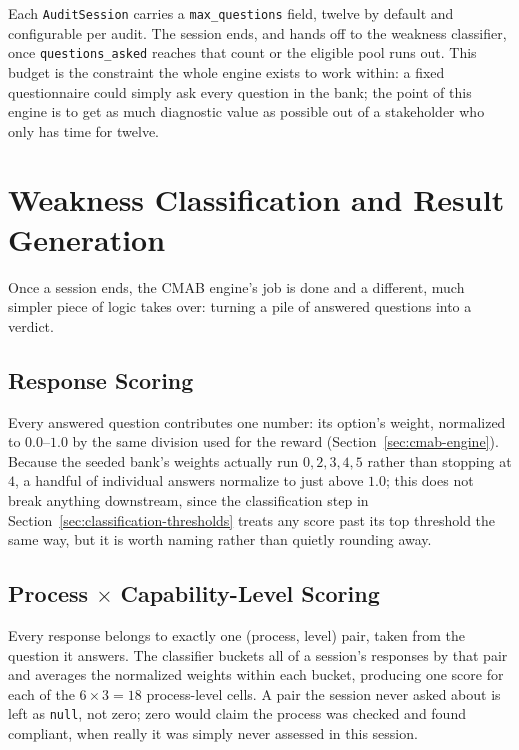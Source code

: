\documentclass[a4paper, 12pt, oneside, openany, BCOR1cm,toc=chapterentrywithdots]{scrbook}
\begin{document}
Each \texttt{AuditSession} carries a \texttt{max\_questions} field, twelve by default and
configurable per audit. The session ends, and hands off to the weakness classifier, once
\texttt{questions\_asked} reaches that count or the eligible pool runs out. This budget is the
constraint the whole engine exists to work within: a fixed questionnaire could simply ask every
question in the bank; the point of this engine is to get as much diagnostic value as possible out
of a stakeholder who only has time for twelve.
\section{Weakness Classification and Result Generation}
\label{sec:weakness-classification}

Once a session ends, the CMAB engine's job is done and a different, much simpler piece of logic
takes over: turning a pile of answered questions into a verdict.

\subsection{Response Scoring}

Every answered question contributes one number: its option's weight, normalized to
$0.0$--$1.0$ by the same division used for the reward
(Section~\ref{sec:cmab-engine}). Because the seeded bank's weights actually run $0, 2, 3, 4, 5$
rather than stopping at $4$, a handful of individual answers normalize to just above $1.0$; this
does not break anything downstream, since the classification step in
Section~\ref{sec:classification-thresholds} treats any score past its top threshold the same way,
but it is worth naming rather than quietly rounding away.

\subsection{Process $\times$ Capability-Level Scoring}

Every response belongs to exactly one (process, level) pair, taken from the question it answers.
The classifier buckets all of a session's responses by that pair and averages the normalized
weights within each bucket, producing one score for each of the $6 \times 3 = 18$
process-level cells. A pair the session never asked about is left as \texttt{null}, not zero;
zero would claim the process was checked and found compliant, when really it was simply never
assessed in this session.
\end{document}

